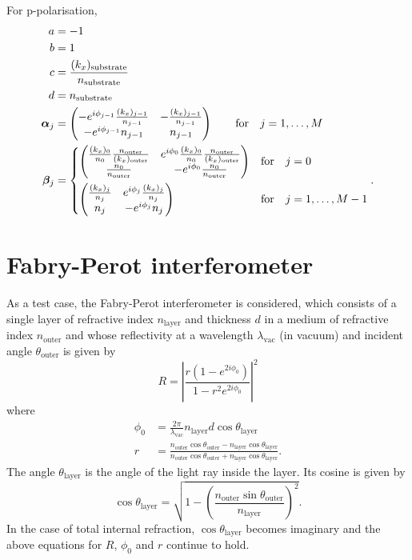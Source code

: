 \documentclass[]{article}
\begin{document}
	For p-polarisation,
	\begin{align}
		a&=-1\\
		b&=1\\
		c&=\frac{(k_x)_\text{substrate}}{n_\text{substrate}}\\
		d&=n_{\text{substrate}}\\
		\bm{\alpha}_j&=
		\begin{pmatrix}
			-e^{i\phi_{j-1}}\frac{(k_x)_{j-1}}{n_{j-1}}&-\frac{(k_x)_{j-1}}{n_{j-1}}\\
			-e^{i\phi_{j-1}}n_{j-1}&n_{j-1}
		\end{pmatrix}\quad\quad\text{for}\quad j=1,\dots,M\\
		\bm{\beta}_j&=
		\begin{dcases}
			\begin{pmatrix}
				\frac{(k_x)_0}{n_0}\frac{n_\text{outer}}{(k_x)_\text{outer}}&e^{i\phi_0}\frac{(k_x)_0}{n_0}\frac{n_\text{outer}}{(k_x)_\text{outer}}\\
				\frac{n_0}{n_\text{outer}}&-e^{i\phi_0}\frac{n_0}{n_\text{outer}}
			\end{pmatrix}&\text{for}\quad j=0\\
			\begin{pmatrix}
				\frac{(k_x)_j}{n_j}&e^{i\phi_j}\frac{(k_x)_j}{n_j}\\
				n_j&-e^{i\phi_j}n_j
			\end{pmatrix}&\text{for}\quad j=1,\dots,M-1
		\end{dcases}.
	\end{align}
	
	\section{Fabry-Perot interferometer}
	As a test case, the Fabry-Perot interferometer is considered, which consists of a single layer of refractive index $n_\text{layer}$ and thickness $d$ in a medium of refractive index $n_\text{outer}$ and whose reflectivity at a wavelength $\lambda_\text{vac}$ (in vacuum) and incident angle $\theta_\text{outer}$ is given by
	\begin{equation}
		R=\left|\frac{r(1-e^{2i\phi_0})}{1-r^2 e^{2i\phi_0}}\right|^2
	\end{equation}
	where 
	\begin{align}
		\phi_0&=\frac{2\pi}{\lambda_\text{vac}}n_\text{layer}d\cos\theta_\text{layer}\\
		r&=\frac{n_\text{outer}\cos\theta_\text{outer}-n_\text{layer}\cos\theta_\text{layer}}{n_\text{outer}\cos\theta_\text{outer}+n_\text{layer}\cos\theta_\text{layer}}.
	\end{align}
	The angle $\theta_\text{layer}$ is the angle of the light ray inside the layer. Its cosine is given by
	\begin{equation}
		\cos\theta_\text{layer}=\sqrt{1-\left(\frac{n_\text{outer}\sin\theta_\text{outer}}{n_\text{layer}}\right)^2}.
	\end{equation}
	In the case of total internal refraction, $\cos\theta_\text{layer}$ becomes imaginary and the above equations for $R$, $\phi_0$ and $r$ continue to hold.
	
%	
%	
	
\end{document}
